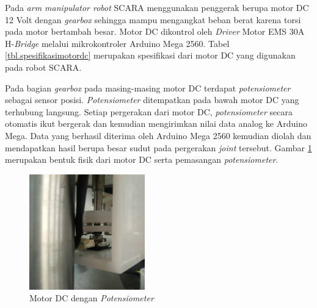 Pada \textit{arm manipulator robot} SCARA menggunakan penggerak berupa motor DC 12 Volt dengan \textit{gearbox} sehingga mampu mengangkat beban berat karena torsi pada motor bertambah besar. Motor DC dikontrol oleh \textit{Driver} Motor EMS 30A H-\textit{Bridge} melalui mikrokontroler Arduino Mega 2560. Tabel \ref{tbl.spesifikasimotordc} merupakan spesifikasi dari motor DC yang digunakan pada robot SCARA. 

	\begin{table}[H]
	\centering
	\caption{Spesifikasi Motor DC pada Robot SCARA}
	\label{tbl.spesifikasimotordc}
\end{table}
Pada bagian \textit{gearbox} pada masing-masing motor DC terdapat \textit{potensiometer} sebagai sensor posisi. \textit{Potensiometer} ditempatkan pada bawah motor DC yang terhubung langsung. Setiap pergerakan dari motor DC, \textit{potensiometer} secara otomatis ikut bergerak dan kemudian mengirimkan nilai data analog ke Arduino Mega. Data yang berhasil diterima oleh Arduino Mega 2560 kemudian diolah dan mendapatkan hasil berupa besar sudut pada pergerakan \textit{joint} tersebut. Gambar \ref{pic.potensiometer} merupakan bentuk fisik dari motor DC serta pemasangan \textit{potensiometer}.
\begin{figure}[H]
	\centering
	\includegraphics[width=5cm]{gambar/potsementara.jpg}
	\caption{Motor DC dengan \textit{Potensiometer}}
	\label{pic.potensiometer}
\end{figure}

